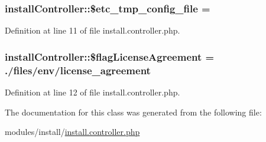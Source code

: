 \subsubsection[{\texorpdfstring{\$etc\+\_\+tmp\+\_\+config\+\_\+file}{$etc_tmp_config_file}}]{\setlength{\rightskip}{0pt plus 5cm}install\+Controller\+::\$etc\+\_\+tmp\+\_\+config\+\_\+file = \textquotesingle{}\textquotesingle{}}\hypertarget{classinstallController_a8e090f5c9a9844fbd8b4f0855a52dc43}{}\label{classinstallController_a8e090f5c9a9844fbd8b4f0855a52dc43}


Definition at line 11 of file install.\+controller.\+php.

\subsubsection[{\texorpdfstring{\$flag\+License\+Agreement}{$flagLicenseAgreement}}]{\setlength{\rightskip}{0pt plus 5cm}install\+Controller\+::\$flag\+License\+Agreement = \textquotesingle{}./{\bf files}/env/license\+\_\+agreement\textquotesingle{}}\hypertarget{classinstallController_af1f7a5fe91be6a576cdffcc07cba5be8}{}\label{classinstallController_af1f7a5fe91be6a576cdffcc07cba5be8}


Definition at line 12 of file install.\+controller.\+php.



The documentation for this class was generated from the following file\+:\begin{DoxyCompactItemize}
\item 
modules/install/\hyperlink{install_8controller_8php}{install.\+controller.\+php}\end{DoxyCompactItemize}
